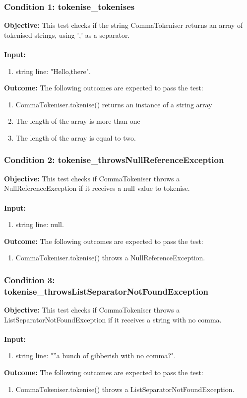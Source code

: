 \documentclass[a4paper,12pt]{article}
\begin{document}
		\subsubsection{Condition 1: tokenise\_tokenises}
			\textbf{Objective:} This test checks if the string CommaTokeniser returns an array of tokenised strings, using ',' as a separator.\\\\
			\textbf{Input:} 
				\begin{enumerate}
					\item string line: "Hello,there".
				\end{enumerate}
			\textbf{Outcome:} The following outcomes are expected to pass the test:
				\begin{enumerate}
					\item CommaTokeniser.tokenise() returns an instance of a string array
					\item The length of the array is more than one
					\item The length of the array is equal to two.
				\end{enumerate}
		\subsubsection{Condition 2: tokenise\_throwsNullReferenceException}
			\textbf{Objective:} This test checks if CommaTokeniser throws a NullReferenceException if it receives a null value to tokenise.\\\\
			\textbf{Input:}
				\begin{enumerate}
					\item string line: null.
				\end{enumerate}
			\textbf{Outcome:} The following outcomes are expected to pass the test:
				\begin{enumerate}
					\item CommaTokeniser.tokenise() throws a NullReferenceException.
				\end{enumerate}
		\subsubsection{Condition 3: tokenise\_throwsListSeparatorNotFoundException}
			\textbf{Objective:} This test checks if CommaTokeniser throws a ListSeparatorNotFoundException if it receives a string with no comma.\\\\
			\textbf{Input:} 
				\begin{enumerate}
					\item string line: "”a bunch of gibberish with no comma?".
				\end{enumerate}
			\textbf{Outcome:} The following outcomes are expected to pass the test:
				\begin{enumerate}
					\item CommaTokeniser.tokenise() throws a ListSeparatorNotFoundException.
				\end{enumerate}
\end{document}
